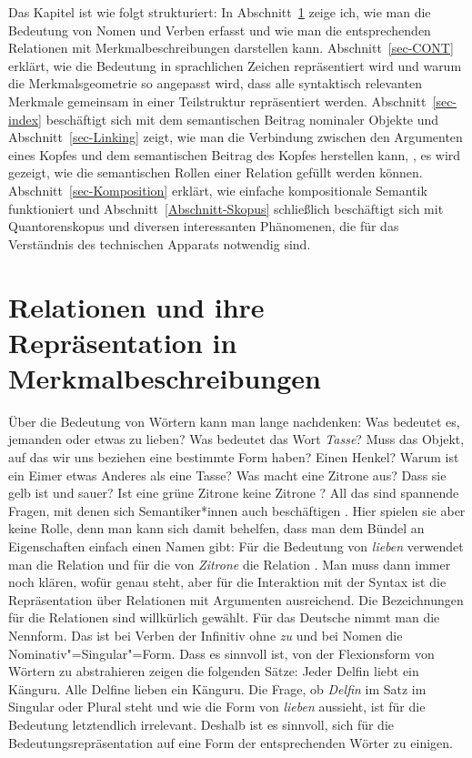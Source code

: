 Das Kapitel ist wie folgt strukturiert: In Abschnitt~\ref{sec-Relationen-und-Merkmalbeschreibungen}
zeige ich, wie man die Bedeutung von Nomen und Verben erfasst und wie man die entsprechenden
Relationen mit Merkmalbeschreibungen darstellen kann. Abschnitt~\ref{sec-CONT} erklärt, wie die
Bedeutung in sprachlichen Zeichen repräsentiert wird und warum die Merkmalsgeometrie so angepasst
wird, dass alle syntaktisch relevanten Merkmale gemeinsam in einer Teilstruktur repräsentiert
werden. Abschnitt~\ref{sec-index} beschäftigt sich mit dem semantischen Beitrag nominaler Objekte
und Abschnitt~\ref{sec-Linking}
zeigt, wie man die Verbindung zwischen den Argumenten eines Kopfes und dem semantischen Beitrag des
Kopfes herstellen kann, \dash, es wird gezeigt, wie die semantischen Rollen einer Relation gefüllt
werden können. Abschnitt~\ref{sec-Komposition} erklärt, wie einfache kompositionale Semantik
funktioniert und Abschnitt~\ref{Abschnitt-Skopus} schließlich beschäftigt sich mit Quantorenskopus und
diversen interessanten Phänomenen, die für das Verständnis des technischen Apparats notwendig sind.




\section{Relationen und ihre Repräsentation in Merkmalbeschreibungen}
\label{sec-Relationen-und-Merkmalbeschreibungen}

Über die Bedeutung von Wörtern kann man lange nachdenken: Was bedeutet es, jemanden oder etwas zu
lieben? Was bedeutet das Wort \emph{Tasse}? Muss das Objekt, auf das wir uns beziehen eine bestimmte
Form haben? Einen Henkel? Warum ist ein Eimer etwas Anderes als eine Tasse? Was macht eine Zitrone
aus? Dass sie gelb ist und sauer? Ist eine grüne Zitrone keine Zitrone \citep{Braisby90}? All das sind spannende
Fragen, mit denen sich Semantiker*innen auch beschäftigen \citep{Rosch1973b-u}. Hier spielen sie aber keine Rolle, denn
man kann sich damit behelfen, dass man dem Bündel an Eigenschaften einfach einen Namen gibt: Für die Bedeutung von \emph{lieben} verwendet man die
Relation  und für die von \emph{Zitrone} die Relation . Man muss
dann immer noch klären, wofür  genau steht, aber für die Interaktion mit der
Syntax ist die Repräsentation über Relationen mit Argumenten ausreichend. Die Bezeichnungen für die
Relationen sind willkürlich gewählt. Für das Deutsche nimmt man die Nennform. Das ist bei Verben der
Infinitiv ohne \emph{zu} und bei Nomen die Nominativ"=Singular"=Form. Dass es sinnvoll ist, von der
Flexionsform von Wörtern zu abstrahieren zeigen die folgenden Sätze:
\eal
\label{ex-Alle-Delfine}
\ex Jeder Delfin liebt ein Känguru.
\ex Alle Delfine lieben ein Känguru.
\zl
Die Frage, ob \emph{Delfin} im Satz im Singular oder Plural steht und wie die Form von \emph{lieben}
aussieht, ist für die Bedeutung letztendlich irrelevant. Deshalb ist es sinnvoll, sich für die
Bedeutungsrepräsentation auf eine Form der entsprechenden Wörter zu einigen.

